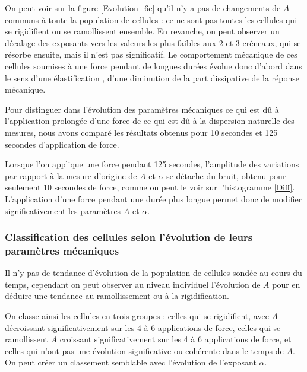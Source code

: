 On peut voir sur la figure \ref{Evolution_6c} qu'il n'y a pas de changements de $A$ communs à toute la population de cellules : ce ne sont pas toutes les cellules qui se rigidifient ou se ramollissent ensemble. 
En revanche, on peut observer un décalage des exposants vers les valeurs les plus faibles aux 2\ieme{} et 3\ieme{} créneaux, qui se résorbe ensuite, mais il n'est pas significatif. 
Le comportement mécanique de ces cellules soumises à une force pendant de longues durées évolue donc d'abord dans le sens d'une \og élastification \fg , d'une diminution de la part dissipative de la réponse mécanique. 

Pour distinguer dans l’évolution des paramètres mécaniques ce qui est dû à l’application prolongée d’une force de ce qui est dû à la dispersion naturelle des mesures, nous avons comparé les résultats obtenus pour 10 secondes et 125 secondes d’application de force.

Lorsque l'on applique une force pendant 125 secondes, l'amplitude des variations par rapport à la mesure d'origine de $A$ et $\alpha$ se détache du bruit, obtenu pour seulement 10 secondes de force, comme on peut le voir sur l'histogramme \ref{Diff}. L'application d'une force pendant une durée plus longue permet donc de modifier significativement les paramètres $A$ et $\alpha$. 

\subsubsection{Classification des cellules selon l'évolution de leurs paramètres mécaniques}

Il n'y pas de tendance d'évolution de la population de cellules sondée au cours du temps, cependant on peut observer au niveau individuel l'évolution de $A$ pour en déduire une tendance au ramollissement ou à la rigidification. 

On classe ainsi les cellules en trois groupes : celles qui se rigidifient, avec $A$ décroissant significativement sur les 4 à 6 applications de force, celles qui se ramollissent $A$ croissant significativement sur les 4 à 6 applications de force, et celles qui n'ont pas une évolution significative ou cohérente dans le temps de $A$. 
On peut créer un classement semblable avec l'évolution de l'exposant $\alpha$. 

